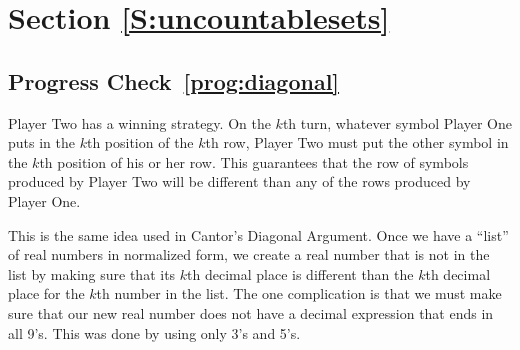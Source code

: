 \section*{Section \ref{S:uncountablesets} }

\subsection*{Progress Check~\ref{prog:diagonal}}
Player Two has a winning strategy.  On the $k$th turn, whatever symbol Player One puts in the 
$k$th position of the $k$th row, Player Two must put the other symbol in the $k$th position of his or her row.  This guarantees that the row of symbols produced by Player Two will be different than any of the rows produced by Player One.

This is the same idea used in Cantor's Diagonal Argument.  Once we have a ``list'' of real numbers in normalized form, we create a real number that is not in the list by making sure that its 
$k$th decimal place is different than the $k$th decimal place for the $k$th number in the list.  The one complication is that we must make sure that our new real number does not have a decimal expression that ends in all 9's.  This was done by using only 3's and 5's.


